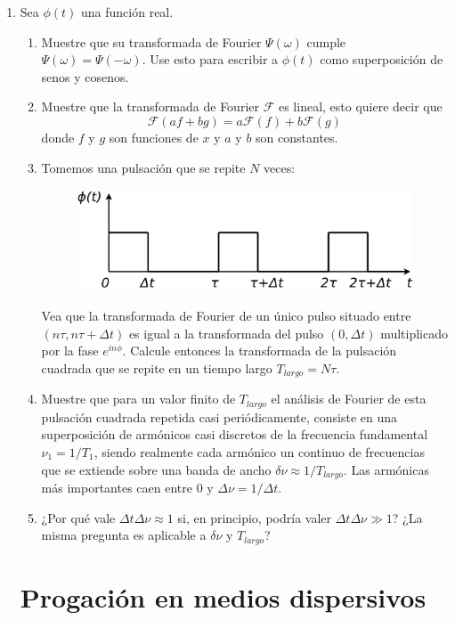 \documentclass[11pt,spanish,a4paper]{article}
\begin{document}
\begin{enumerate}
\item Sea $\phi(t)$ una función real.
\begin{enumerate}
	\item Muestre que su transformada de Fourier $\Psi(\omega)$ cumple $\Psi(\omega)=\Psi(-\omega)$.
Use esto para escribir a $\phi(t)$ como superposición de senos y
cosenos.
	\item Muestre que la transformada de Fourier $\mathcal{F}$ es lineal, esto
quiere decir que
\[
\mathcal{F}(af+bg)=a\mathcal{F}(f)+b\mathcal{F}(g)
\]
donde $f$ y $g$ son funciones de $x$ y $a$ y $b$ son constantes.
	\item Tomemos una pulsación que se repite $N$ veces:
\begin{figure}[H]
\centering{}\includegraphics[clip,scale=0.25]{ej2-18}
\end{figure}
Vea que la transformada de Fourier de un único pulso situado entre
$(n\tau,n\tau+\Delta t)$ es igual a la transformada del pulso $(0,\Delta t)$
multiplicado por la fase $e^{in\phi}$. Calcule entonces la transformada
de la pulsación cuadrada que se repite en un tiempo largo $T_{largo}=N\tau$.
	\item Muestre que para un valor finito de $T_{largo}$ el análisis de Fourier
de esta pulsación cuadrada repetida casi periódicamente, consiste
en una superposición de armónicos casi discretos de la frecuencia
fundamental $\nu_{1}=1/T_{1}$, siendo realmente cada armónico un
continuo de frecuencias que se extiende sobre una banda de ancho $\delta\nu\approx1/T_{largo}$.
Las armónicas más importantes caen entre 0 y $\Delta\nu=1/\Delta t$.
	\item ¿Por qué vale $\Delta t\Delta\nu\approx1$ si, en principio, podría
valer $\Delta t\Delta\nu\gg1$? ¿La misma pregunta es aplicable a
$\delta\nu$ y $T_{largo}$?
\end{enumerate}


\section*{Progación en medios dispersivos}


\end{enumerate}
\end{document}
